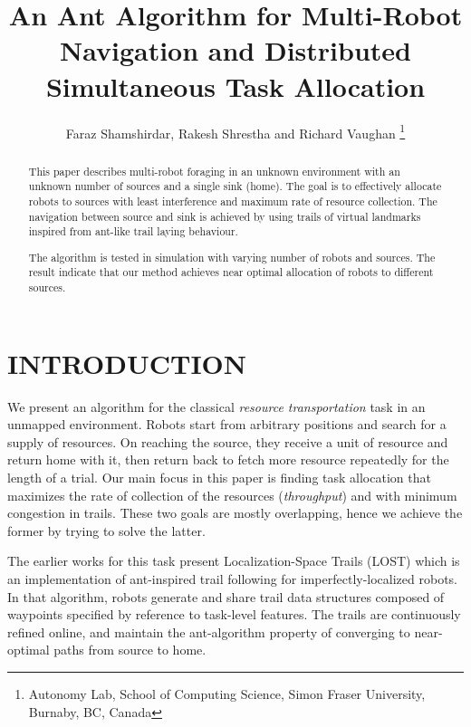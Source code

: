 \documentclass[letterpaper, 10 pt, conference]{ieeeconf}  %
\title{\LARGE \bf
An Ant Algorithm for Multi-Robot Navigation and Distributed Simultaneous Task Allocation
}
\author{Faraz Shamshirdar, Rakesh Shrestha and Richard Vaughan %
\thanks{Autonomy Lab, School of Computing Science, Simon Fraser University,
        Burnaby, BC, Canada
     }%
}
\begin{document}
\maketitle
\thispagestyle{empty}
\pagestyle{empty}


\begin{abstract}
This paper describes multi-robot foraging in an unknown environment with an unknown number of sources and a single sink (home). The goal is to effectively allocate robots to sources with least interference and maximum rate of resource collection. The navigation between source and sink is achieved by using trails of virtual landmarks inspired from ant-like trail laying behaviour.

The algorithm is tested in simulation with varying number of robots and sources. The result indicate that our method achieves near optimal allocation of robots to different sources.

\end{abstract}


\section{INTRODUCTION}

We present an algorithm for the classical \emph{resource transportation} task in an unmapped environment. Robots start from arbitrary positions and search for a supply of resources.  On reaching the source, they receive a unit of resource and return home with it, then return back to fetch more resource repeatedly for the length of a trial.
Our main focus in this paper is finding task allocation that maximizes the rate of collection of the resources (\emph{throughput}) and with minimum congestion in trails. These two goals are mostly overlapping, hence we achieve the former by trying to solve the latter.

The earlier works \cite{LOST} for this task present Localization-Space Trails (LOST)  which is an implementation of ant-inspired trail following for imperfectly-localized robots. In that algorithm, robots generate and share trail data structures composed of waypoints specified by reference to task-level features. The trails are continuously refined online, and maintain the ant-algorithm property \cite{dorigo1992} of converging to  near-optimal paths from source to home.
\end{document}
